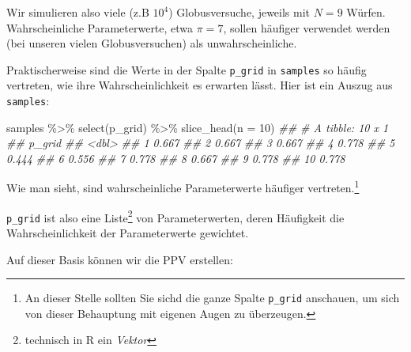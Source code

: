 \documentclass[
  a4paper,
  DIV=11]{scrreprt}
\newenvironment{Shaded}{\begin{snugshade}}{\end{snugshade}}
\newcommand{\AttributeTok}[1]{\textcolor[rgb]{0.40,0.45,0.13}{#1}}
\newcommand{\DecValTok}[1]{\textcolor[rgb]{0.68,0.00,0.00}{#1}}
\newcommand{\DocumentationTok}[1]{\textcolor[rgb]{0.37,0.37,0.37}{\textit{#1}}}
\newcommand{\FloatTok}[1]{\textcolor[rgb]{0.68,0.00,0.00}{#1}}
\newcommand{\FunctionTok}[1]{\textcolor[rgb]{0.28,0.35,0.67}{#1}}
\newcommand{\NormalTok}[1]{\textcolor[rgb]{0.00,0.23,0.31}{#1}}
\newcommand{\OtherTok}[1]{\textcolor[rgb]{0.00,0.23,0.31}{#1}}
\newcommand{\SpecialCharTok}[1]{\textcolor[rgb]{0.37,0.37,0.37}{#1}}
\theoremstyle{definition}
\theoremstyle{remark}
\begin{document}
Wir simulieren also viele (z.B \(10^4\)) Globusversuche, jeweils mit
\(N=9\) Würfen. Wahrscheinliche Parameterwerte, etwa \(\pi=7\), sollen
häufiger verwendet werden (bei unseren vielen Globusversuchen) als
unwahrscheinliche.

Praktischerweise sind die Werte in der Spalte \texttt{p\_grid} in
\texttt{samples} so häufig vertreten, wie ihre Wahrscheinlichkeit es
erwarten lässt. Hier ist ein Auszug aus \texttt{samples}:

\begin{Shaded}
\begin{Highlighting}[]
\NormalTok{samples }\SpecialCharTok{\%\textgreater{}\%} 
  \FunctionTok{select}\NormalTok{(p\_grid) }\SpecialCharTok{\%\textgreater{}\%} 
  \FunctionTok{slice\_head}\NormalTok{(}\AttributeTok{n =} \DecValTok{10}\NormalTok{)}
\DocumentationTok{\#\# \# A tibble: 10 x 1}
\DocumentationTok{\#\#    p\_grid}
\DocumentationTok{\#\#     \textless{}dbl\textgreater{}}
\DocumentationTok{\#\#  1  0.667}
\DocumentationTok{\#\#  2  0.667}
\DocumentationTok{\#\#  3  0.667}
\DocumentationTok{\#\#  4  0.778}
\DocumentationTok{\#\#  5  0.444}
\DocumentationTok{\#\#  6  0.556}
\DocumentationTok{\#\#  7  0.778}
\DocumentationTok{\#\#  8  0.667}
\DocumentationTok{\#\#  9  0.778}
\DocumentationTok{\#\# 10  0.778}
\end{Highlighting}
\end{Shaded}

Wie man sieht, sind wahrscheinliche Parameterwerte häufiger
vertreten.\footnote{An dieser Stelle sollten Sie sichd die ganze Spalte
  \texttt{p\_grid} anschauen, um sich von dieser Behauptung mit eigenen
  Augen zu überzeugen.}

\texttt{p\_grid} ist also eine Liste\footnote{technisch in R ein
  \emph{Vektor}} von Parameterwerten, deren Häufigkeit die
Wahrscheinlichkeit der Parameterwerte gewichtet.

Auf dieser Basis können wir die PPV erstellen:

\begin{Shaded}
\end{Shaded}
\end{document}
